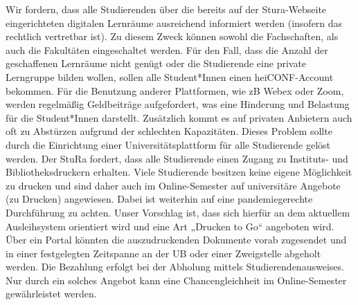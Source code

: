 {        Wir fordern, dass alle Studierenden über die bereits auf der Stura-Webseite
        eingerichteten digitalen
        Lernräume ausreichend informiert werden (insofern das rechtlich vertretbar ist). Zu
        diesem Zweck
        können sowohl die Fachschaften, als auch die Fakultäten eingeschaltet werden. Für den
        Fall, dass
        die Anzahl der geschaffenen Lernräume nicht genügt oder die Studierende eine private
        Lerngruppe
        bilden wollen, sollen alle Student*Innen einen heiCONF-Account bekommen. Für die
        Benutzung
        anderer Plattformen, wie zB Webex oder Zoom, werden regelmäßig Geldbeiträge
        aufgefordert, was
        eine Hinderung und Belastung für die Student*Innen darstellt. Zusätzlich kommt es auf
        privaten
        Anbietern auch oft zu Abstürzen aufgrund der schlechten Kapazitäten. Dieses Problem
        sollte durch
        die Einrichtung einer Universitätsplattform für alle Studierende gelöst werden.
        Der StuRa fordert, dass alle Studierende einen Zugang zu Instituts- und
        Bibliotheksdruckern
        erhalten. Viele Studierende besitzen keine eigene Möglichkeit zu drucken und sind
        daher auch im
        Online-Semester auf universitäre Angebote (zu Drucken) angewiesen. Dabei ist
        weiterhin auf eine
        pandemiegerechte Durchführung zu achten.
        Unser Vorschlag ist, dass sich hierfür an dem aktuellem Ausleihsystem orientiert wird
        und eine Art
        „Drucken to Go“ angeboten wird. Über ein Portal könnten die auszudruckenden Dokumente
        vorab
        zugesendet und in einer festgelegten Zeitspanne an der UB oder einer Zweigstelle
        abgeholt werden.
        Die Bezahlung erfolgt bei der Abholung mittels Studierendenausweises.
        Nur durch ein solches Angebot kann eine Chancengleichheit im Online-Semester
        gewährleistet
        werden.
    }{
    }{
    }{
    }
